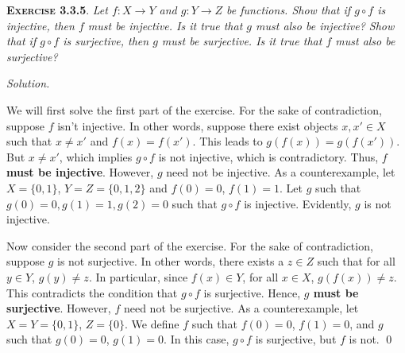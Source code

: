 \documentclass[12pt]{article}
\theoremstyle{remark}
\newenvironment{exer}[2]{
    \noindent \setlength{\parskip}{1em}%
    \textsc{\textbf{Exercise #1}}. \textit{#2} \par
    \noindent \textit{Solution.} %
}{\bigskip}
\begin{document}
\begin{exer}{3.3.5}{
    Let $f : X \to Y$ and $g : Y \to Z$ be functions.
    Show that if $g \circ f$ is injective, then $f$ must be injective.
    Is it true that $g$ must also be injective?
    Show that if $g \circ f$ is surjective, then $g$ must be surjective.
    Is it true that $f$ must also be surjective?
}
    We will first solve the first part of the exercise.
    For the sake of contradiction, suppose $f$ isn't injective.
    In other words, suppose there exist objects $x, x' \in X$ such that $x \ne x'$ and $f(x) = f(x')$.
    This leads to $g(f(x)) = g(f(x'))$.
    But $x \ne x'$, which implies $g \circ f$ is not injective, which is contradictory.
    Thus, \textbf{$f$ must be injective}.
    However, $g$ need not be injective.
    As a counterexample, let $X = \{ 0, 1 \}$, $Y = Z = \{ 0, 1, 2 \}$ and $f(0) = 0$, $f(1) = 1$.
    Let $g$ such that $g(0) = 0, g(1) = 1, g(2) = 0$ such that $g \circ f$ is injective.
    Evidently, $g$ is not injective.

    Now consider the second part of the exercise.
    For the sake of contradiction, suppose $g$ is not surjective.
    In other words, there exists a $z \in Z$ such that for all $y \in Y$, $g(y) \ne z$.
    In particular, since $f(x) \in Y$, for all $x \in X$, $g(f(x)) \ne z$.
    This contradicts the condition that $g \circ f$ is surjective.
    Hence, \textbf{$g$ must be surjective}.
    However, $f$ need not be surjective.
    As a counterexample, let $X = Y = \{ 0, 1 \}$, $Z = \{ 0 \}$.
    We define $f$ such that $f(0) = 0$, $f(1) = 0$, and $g$ such that $g(0) = 0$, $g(1) = 0$.
    In this case, $g \circ f$ is surjective, but $f$ is not. \qed
\end{exer}
\end{document}
